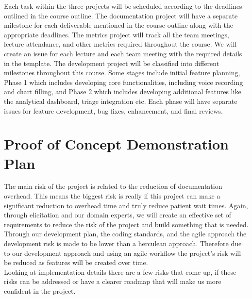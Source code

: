\documentclass{article}
\begin{document}
Each task within the three projects will be scheduled according to the deadlines outlined in the course outline. The documentation project will have a separate milestone for each deliverable mentioned in the course outline along with the appropriate deadlines. The metrics project will track all the team meetings, lecture attendance, and other metrics required throughout the course. We will create an issue for each lecture and each team meeting with the required details in the template. The development project will be classified into different milestones throughout this course. Some stages include initial feature planning, Phase 1 which includes developing core functionalities, including voice recording and chart filling, and Phase 2 which includes developing additional features like the analytical dashboard, triage integration etc. Each phase will have separate issues for feature development, bug fixes, enhancement, and final reviews.  

\section{Proof of Concept Demonstration Plan}

The main risk of the project is related to the reduction of documentation overhead. This means the biggest risk is really if this project can make a significant reduction to overhead time and truly reduce patient wait times. Again, through elicitation and our domain experts, we will create an effective set of requirements to reduce the risk of the project and build something that is needed.\\

Through our development plan, the coding standards, and the agile approach the development risk is made to be lower than a herculean approach. Therefore due to our development approach and using an agile workflow the project's risk will be reduced as features will be created over time.\\

Looking at implementation details there are a few risks that come up, if these risks can be addressed or have a clearer roadmap that will make us more confident in the project. 
\end{document}
